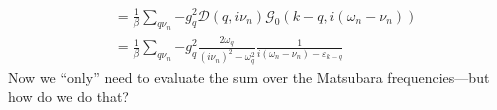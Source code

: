 \begin{align*}
    &=\frac{1}{\beta}\sum_{q\nu _n}{-g_{q}^{2}\mathscr{D} \left( q,i\nu _n \right) \mathcal{G} _0\left( k-q,i\left( \omega _n-\nu _n \right) \right)}\\
    &=\frac{1}{\beta}\sum_{q\nu _n}{-g_{q}^{2}\frac{2\omega _q}{\left( i\nu _n \right) ^2-\omega _{q}^{2}}\frac{1}{i\left( \omega _n-\nu _n \right) -\varepsilon _{k-q}}}
\end{align*}
Now we ``only'' need to evaluate the sum over the Matsubara frequencies---but how do we do that?
